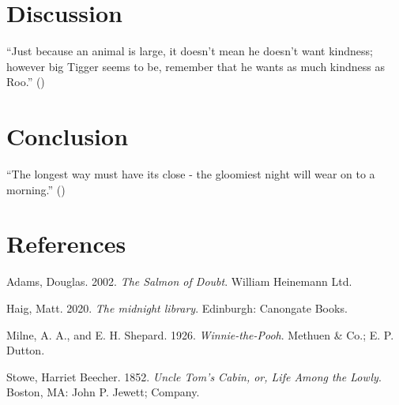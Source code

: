 \documentclass[
  12pt,
  a4paper,
]{scrbook}
\newlength{\cslhangindent}
\newenvironment{CSLReferences}[2] %
 {\begin{list}{}{%
  \setlength{\itemindent}{0pt}
  \setlength{\leftmargin}{0pt}
  \setlength{\parsep}{0pt}
  \ifodd #1
   \setlength{\leftmargin}{\cslhangindent}
   \setlength{\itemindent}{-1\cslhangindent}
  \fi
  \setlength{\itemsep}{#2\baselineskip}}}
 {\end{list}}
\begin{document}
\lipsum[41-60]


\chapter{Discussion}\label{discussion}

``Just because an animal is large, it doesn't mean he doesn't want
kindness; however big Tigger seems to be, remember that he wants as much
kindness as Roo.'' ()

\lipsum[61-80]


\chapter{Conclusion}\label{conclusion}

``The longest way must have its close - the gloomiest night will wear on
to a morning.'' ()

\lipsum[81-90]


\chapter*{References}\label{references}


\begingroup
\raggedright

\label{refs}
\begin{CSLReferences}{1}{0}
Adams, Douglas. 2002. \emph{{The Salmon of Doubt}}. William Heinemann
Ltd.

Haig, Matt. 2020. \emph{{The midnight library}}. Edinburgh: Canongate
Books.

Milne, A. A., and E. H. Shepard. 1926. \emph{Winnie-the-{Pooh}}. Methuen
\& Co.; E. P. Dutton.

Stowe, Harriet Beecher. 1852. \emph{Uncle Tom's Cabin, or, Life Among
the Lowly}. Boston, MA: John P. Jewett; Company.

\end{CSLReferences}

\endgroup


\backmatter
\end{document}
